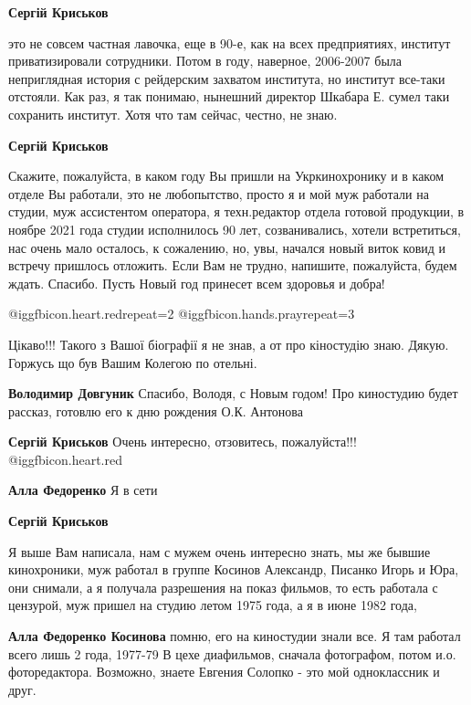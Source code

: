 \begin{itemize}
\begin{itemize}
\textbf{Сергій Криськов} 

это не совсем частная лавочка, еще в 90-е, как на всех предприятиях, институт
приватизировали сотрудники. Потом в году, наверное, 2006-2007 была неприглядная
история с рейдерским захватом института, но институт все-таки отстояли. Как
раз, я так понимаю, нынешний директор Шкабара Е. сумел таки сохранить институт.
Хотя что там сейчас, честно, не знаю.

\textbf{Сергій Криськов} 

Скажите, пожалуйста, в каком году Вы пришли на Укркинохронику и в каком отделе
Вы работали, это не любопытство, просто я и мой муж работали на студии, муж
ассистентом оператора, я техн.редактор отдела готовой продукции, в ноябре 2021
года студии исполнилось 90 лет, созванивались, хотели встретиться, нас очень
мало осталось, к сожалению, но, увы, начался новый виток ковид и встречу
пришлось отложить. Если Вам не трудно, напишите, пожалуйста, будем ждать.
Спасибо. Пусть Новый год принесет всем здоровья и добра!

@igg{fbicon.heart.red}{repeat=2} @igg{fbicon.hands.pray}{repeat=3} 
\end{itemize} %


Цікаво!!! Такого з Вашої біографії я не знав, а от про кіностудію знаю. Дякую.
Горжусь що був Вашим Колегою по отельні.

\begin{itemize} %
\textbf{Володимир Довгуник} Спасибо, Володя, с Новым годом! Про киностудию будет рассказ, готовлю его к дню рождения О.К. Антонова

\begin{itemize} %
\textbf{Сергій Криськов} Очень интересно, отзовитесь, пожалуйста!!! @igg{fbicon.heart.red}

\textbf{Алла Федоренко} Я в сети

\textbf{Сергій Криськов} 

Я выше Вам написала, нам с мужем очень интересно знать, мы же бывшие
кинохроники, муж работал в группе Косинов Александр, Писанко Игорь и Юра, они
снимали, а я получала разрешения на показ фильмов, то есть работала с цензурой,
муж пришел на студию летом 1975 года, а я в июне 1982 года,

\textbf{Алла Федоренко Косинова} помню, его на киностудии знали все.
Я там работал всего лишь 2 года, 1977-79
В цехе диафильмов, сначала фотографом, потом и.о. фоторедактора.
Возможно, знаете Евгения Солопко - это мой одноклассник и друг.


\end{itemize}
\end{itemize}
\end{itemize}
